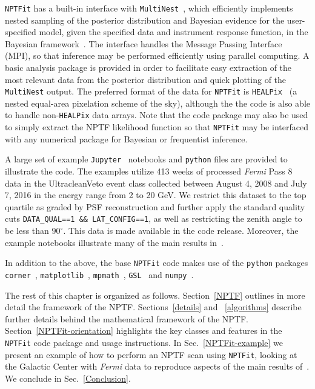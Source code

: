  \texttt{NPTFit} has a built-in interface with \texttt{MultiNest}~\cite{Feroz:2008xx,Buchner:2014nha}, which efficiently implements nested sampling of the posterior distribution and Bayesian evidence for the user-specified model, given the specified data and instrument response function, in the Bayesian framework~\cite{Feroz:2013hea,Feroz:2007kg,skilling2006}.  The interface handles the Message Passing Interface (MPI), so that inference may be performed efficiently using parallel computing.  A basic analysis package is provided in order to facilitate easy extraction of the most relevant data from the posterior distribution and quick plotting of the \texttt{MultiNest} output.  The preferred format of the data for \texttt{NPTFit} is \texttt{HEALPix}~\cite{Gorski:2004by} (a nested equal-area pixelation scheme of the sky), although the the code is also able to handle non-\texttt{HEALPix} data arrays. Note that the code package may also be used to simply extract the NPTF likelihood function so that \texttt{NPTFit} may be interfaced with any numerical package for Bayesian or frequentist inference.

A large set of example \texttt{Jupyter}~\cite{PER-GRA:2007} notebooks and \texttt{python} files are provided to illustrate the code.  The examples utilize 413 weeks of processed \emph{Fermi} Pass 8 data in the UltracleanVeto event class collected between August 4, 2008 and July 7, 2016 in the energy range from 2 to 20 GeV. We restrict this dataset to the top quartile as graded by PSF reconstruction and further apply the standard quality cuts \texttt{DATA\_QUAL==1 \&\& LAT\_CONFIG==1}, as well as restricting the zenith angle to be less than $90^\circ$. This data is made available in the code release.  Moreover, the example notebooks illustrate many of the main results in~\cite{Lee:2015fea,Linden:2016rcf,Lisanti:2016jub}.

In addition to the above, the base \texttt{NPTFit} code makes use of the \texttt{python} packages \texttt{corner}~\cite{dan_foreman_mackey_2016_53155}, \texttt{matplotlib}~\cite{Hunter:2007}, \texttt{mpmath}~\cite{mpmath}, \texttt{GSL}~\cite{galassi2015gnu} and  \texttt{numpy}~\cite{oliphant2006guide}.

The rest of this chapter is organized as follows.  Section~\ref{NPTF} outlines in more detail the framework of the NPTF. Sections~\ref{details} and ~\ref{algorithms} describe further details behind the mathematical framework of the NPTF. Section~\ref{NPTFit-orientation} highlights the key classes and features in the \texttt{NPTFit} code package and usage instructions.  In Sec.~\ref{NPTFit-example} we present an example of how to perform an NPTF scan using \texttt{NPTFit}, looking at the Galactic Center with \emph{Fermi} data to reproduce aspects of the main results of~\cite{Lee:2015fea}. We conclude in Sec.~\ref{Conclusion}. 

